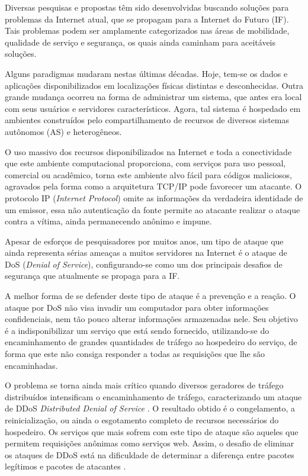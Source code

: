 
Diversas pesquisas e propostas têm sido desenvolvidas buscando soluções para problemas da Internet atual, que se propagam para a Internet do Futuro (IF). Tais problemas podem ser amplamente categorizados nas áreas de mobilidade, qualidade de serviço e segurança, os quais ainda caminham para aceitáveis soluções.

Alguns paradigmas mudaram nestas últimas décadas. Hoje, tem-se os dados e aplicações disponibilizados em localizações físicas distintas e desconhecidas. Outra grande mudança ocorreu na forma de administrar um sistema, que antes era local com seus usuários e servidores característicos. Agora, tal sistema é hospedado em ambientes construídos pelo compartilhamento de recursos de diversos sistemas autônomos (AS) e heterogêneos.

O uso massivo dos recursos disponibilizados na Internet e toda a conectividade que este ambiente computacional proporciona, com serviços para uso pessoal, comercial ou acadêmico, torna este ambiente alvo fácil para códigos maliciosos, agravados pela forma como a arquitetura TCP/IP pode favorecer um atacante. O protocolo IP (\emph{Internet Protocol}) omite as informações da verdadeira identidade de um emissor, essa não autenticação da fonte permite ao atacante realizar o ataque contra a vítima, ainda permanecendo anônimo e impune.

Apesar de esforços de pesquisadores por muitos anos, um tipo de ataque que ainda representa sérias ameaças a muitos servidores na Internet é o ataque de DoS (\emph{Denial of Service}), configurando-se como um dos principais desafios de segurança que atualmente se propaga para a IF. 


A melhor forma de se defender deste tipo de ataque é a prevenção e a reação. O ataque por DoS não visa invadir um computador para obter informações confidenciais, nem tão pouco alterar informações armazenadas nele. Seu objetivo é a indisponibilizar um serviço que está sendo fornecido, utilizando-se do encaminhamento de grandes quantidades de tráfego ao hospedeiro do serviço, de forma que este não consiga responder a todas as requisições que lhe são encaminhadas. 

O problema se torna ainda mais crítico quando diversos geradores de tráfego distribuídos intensificam o encaminhamento de tráfego, caracterizando um ataque de DDoS \emph{Distributed Denial of Service} \cite{Sachdeva08ddosincidents}. O resultado obtido é o congelamento, a reinicialização, ou ainda o esgotamento completo de recursos necessários do hospedeiro. Os serviços que mais sofrem com este tipo de ataque são aqueles que permitem requisições anônimas como serviços web. Assim, o desafio de eliminar os ataques de DDoS está na dificuldade de determinar a diferença entre pacotes legítimos e pacotes de atacantes \cite{Li:2009:DDA:1683304.1684620}.


